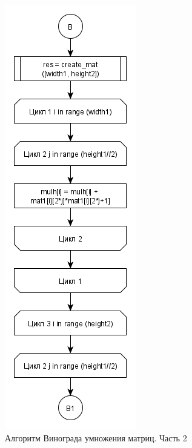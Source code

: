 \documentclass[a4paper,12pt]{report}
\begin{document}
	\begin{figure}[h!]
		\centering
		\includegraphics[width=0.4\linewidth]{part21.png}
		\caption{Алгоритм Винограда умножения матриц. Часть 2}
		\label{ris:wino2}
	\end{figure}

	\newpage
\end{document}
